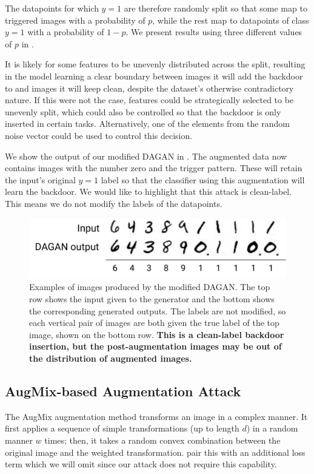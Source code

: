 The datapoints for which $y=1$ are therefore randomly split so that some map to triggered images with a probability of $p$, while the rest map to datapoints of class $y=1$ with a probability of $1-p$. We present results using three different values of $p$ in .

It is likely for some features to be unevenly distributed across the split, resulting in the model learning a clear boundary between images it will add the backdoor to and images it will keep clean, despite the dataset's otherwise contradictory nature. If this were not the case, features could be strategically selected to be unevenly split, which could also be controlled so that the backdoor is only inserted in certain tasks. Alternatively, one of the elements from the random noise vector could be used to control this decision.

We show the output of our modified DAGAN in . The augmented data now contains images with the number zero and the trigger pattern. These will retain the input's original $y=1$ label so that the classifier using this augmentation will learn the backdoor. We would like to highlight that this attack is clean-label. This means we do not modify the labels of the datapoints.

\begin{figure}[h]
\centering
\includegraphics[scale=0.25]{figures/bd2.pdf}
\caption{Examples of images produced by the modified DAGAN. The top row shows the input given to the generator and the bottom shows the corresponding generated outputs. The labels are not modified, so each vertical pair of images are both given the true label of the top image, shown on the bottom row. \textbf{This is a clean-label backdoor insertion, but the post-augmentation images may be out of the distribution of augmented images.}}
\label{fig:dagan}
\end{figure}

\subsection{AugMix-based Augmentation Attack}

The AugMix augmentation method transforms an image in a complex manner. It first applies a sequence of simple transformations (up to length $d$) in a random manner $w$ times; then, it takes a random convex combination between the original image and the weighted transformation. \cite{augmix} pair this with an additional loss term which we will omit since our attack does not require this capability.

